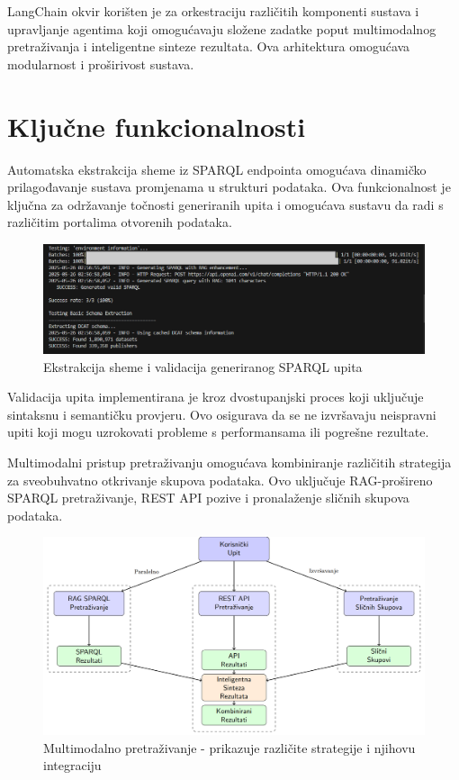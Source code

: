 LangChain okvir korišten je za orkestraciju različitih komponenti sustava i upravljanje agentima koji omogućavaju složene zadatke poput multimodalnog pretraživanja i inteligentne sinteze rezultata. Ova arhitektura omogućava modularnost i proširivost sustava.

\section{Ključne funkcionalnosti}

Automatska ekstrakcija sheme iz SPARQL endpointa omogućava dinamičko prilagođavanje sustava promjenama u strukturi podataka. Ova funkcionalnost je ključna za održavanje točnosti generiranih upita i omogućava sustavu da radi s različitim portalima otvorenih podataka.

\begin{figure}[htbp]
    \centering
    \includegraphics[width=1\textwidth]{figures/izvjestaj_image_11.png}
    \caption{Ekstrakcija sheme i validacija generiranog SPARQL upita}
    \label{fig:schema_extraction}
\end{figure}

Validacija upita implementirana je kroz dvostupanjski proces koji uključuje sintaksnu i semantičku provjeru. Ovo osigurava da se ne izvršavaju neispravni upiti koji mogu uzrokovati probleme s performansama ili pogrešne rezultate.

Multimodalni pristup pretraživanju omogućava kombiniranje različitih strategija za sveobuhvatno otkrivanje skupova podataka. Ovo uključuje RAG-prošireno SPARQL pretraživanje, REST API pozive i pronalaženje sličnih skupova podataka.

\begin{figure}[htbp]
    \centering
    \includegraphics[width=1\textwidth]{figures/multimodal_search.png}
    \caption{Multimodalno pretraživanje - prikazuje različite strategije i njihovu integraciju}
    \label{fig:multimodal_search}
\end{figure}

